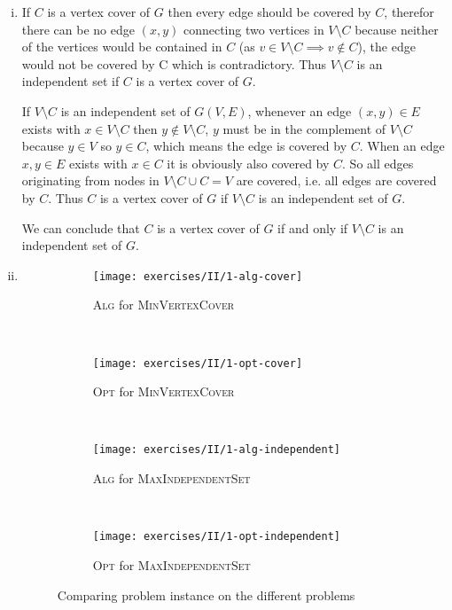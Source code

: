 \begin{enumerate}[(i)]
	\item If $C$ is a vertex cover of $G$ then every edge should be covered by $C$, therefor there can be no edge $(x,y)$ connecting two vertices in $V \setminus C$ because neither of the vertices would be contained in $C$ (as $v \in V \setminus C \implies v \not \in C$), the edge would not be covered by C which is contradictory. Thus $V \setminus C$ is an independent set if $C$ is a vertex cover of $G$.

If $V \setminus C$ is an independent set of $G(V,E)$, whenever an edge $(x,y) \in E$ exists with $x \in V \setminus C$ then $y \not \in V \setminus C$, $y$ must be in the complement of $V \setminus C$ because $y \in V$ so $y \in C$, which means the edge is covered by $C$. When an edge $x,y \in E$ exists with $x \in C$ it is obviously also covered by $C$. So all edges originating from nodes in $V \setminus C \cup C = V$ are covered, i.e. all edges are covered by $C$. Thus $C$ is a vertex cover of $G$ if $V \setminus C$ is an independent set of $G$.

We can conclude that $C$ is a vertex cover of $G$ if and only if $V \setminus C$ is an independent set of $G$.
	\item
		\begin{figure}[H]
			\centering
			\begin{subfigure}[b]{0.45\textwidth}
				\centering
				\texttt{[image: exercises/II/1-alg-cover]}
				\caption{\textsc{Alg} for \textsc{MinVertexCover}}
				\label{fig:set2:ex1:cover:alg}
			\end{subfigure}
			~
			\begin{subfigure}[b]{0.45\textwidth}
				\centering
				\texttt{[image: exercises/II/1-opt-cover]}
				\caption{\textsc{Opt} for \textsc{MinVertexCover}}
				\label{fig:set2:ex1:cover:opt}
			\end{subfigure}
			\\
			\begin{subfigure}[b]{0.45\textwidth}
				\centering
				\texttt{[image: exercises/II/1-alg-independent]}
				\caption{\textsc{Alg} for \textsc{MaxIndependentSet}}
				\label{fig:set2:ex1:cover:alg}
			\end{subfigure}
			~
			\begin{subfigure}[b]{0.45\textwidth}
				\centering
				\texttt{[image: exercises/II/1-opt-independent]}
				\caption{\textsc{Opt} for \textsc{MaxIndependentSet}}
				\label{fig:set2:ex1:cover:opt}
			\end{subfigure}
			\caption{Comparing problem instance on the different problems}
			\label{fig:set2:ex1}
		\end{figure}
\end{enumerate}
